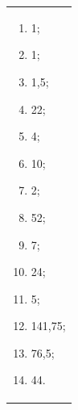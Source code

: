 \documentclass[a4paper,10pt]{article} %
\begin{document}
\begin{spacing}{1.0}
{\begin{tabular}{p{20cm}}
\begin{multicols}{5}
\begin{enumerate}
\item 1;
\item 1;
\item 1,5;
\item 22;
\item 4;
\item 10;
\item 2;
\item 52;
\item 7;
\item 24;
\item 5;
\item 141,75;
\item 76,5;
\item 44.

\end{enumerate}
\end{multicols}
\\
    \end{tabular}





}
\end{spacing}
\end{document}
